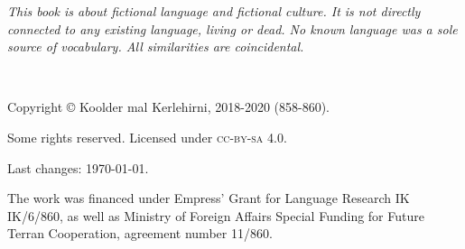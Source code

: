 \emph{This book is about fictional language and fictional culture. It is not
directly connected to any existing language, living or dead. No known language
was a sole source of vocabulary. All similarities are coincidental.}

~\vfill

\begingroup
\setlength\parindent{0pt}\footnotesize
Copyright © Koolder mal Kerlehirni, 2018-2020 (858-860).

\bigskip

Some rights reserved. Licensed under \textsc{cc-by-sa} 4.0.

Last changes: \today{}.

\medskip

The work was financed under Empress' Grant for Language Research IK IK/6/860,
as well as Ministry of Foreign Affairs Special Funding for Future Terran
Cooperation, agreement number 11/860.

\endgroup